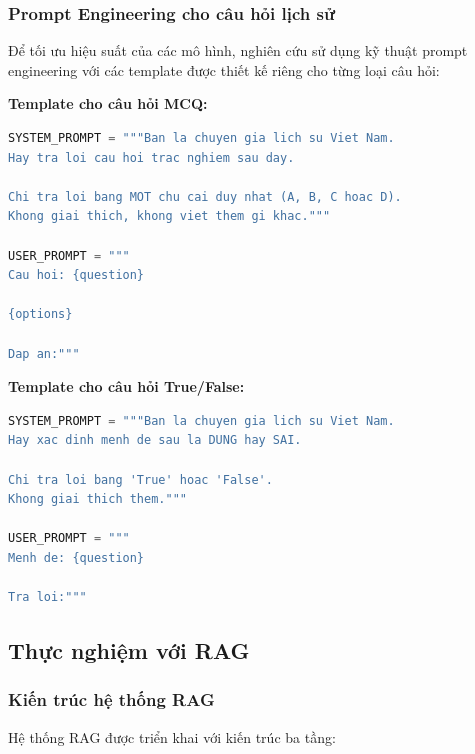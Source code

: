 \subsubsection{Prompt Engineering cho câu hỏi lịch sử}

Để tối ưu hiệu suất của các mô hình, nghiên cứu sử dụng kỹ thuật prompt engineering với các template được thiết kế riêng cho từng loại câu hỏi:

\textbf{Template cho câu hỏi MCQ:}
\begin{lstlisting}[language=Python, caption={Prompt template cho câu hỏi trắc nghiệm}]
SYSTEM_PROMPT = """Ban la chuyen gia lich su Viet Nam. 
Hay tra loi cau hoi trac nghiem sau day.

Chi tra loi bang MOT chu cai duy nhat (A, B, C hoac D).
Khong giai thich, khong viet them gi khac."""

USER_PROMPT = """
Cau hoi: {question}

{options}

Dap an:"""
\end{lstlisting}

\textbf{Template cho câu hỏi True/False:}
\begin{lstlisting}[language=Python, caption={Prompt template cho câu hỏi đúng/sai}]
SYSTEM_PROMPT = """Ban la chuyen gia lich su Viet Nam.
Hay xac dinh menh de sau la DUNG hay SAI.

Chi tra loi bang 'True' hoac 'False'.
Khong giai thich them."""

USER_PROMPT = """
Menh de: {question}

Tra loi:"""
\end{lstlisting}

\subsection{Thực nghiệm với RAG}

\subsubsection{Kiến trúc hệ thống RAG}

Hệ thống RAG được triển khai với kiến trúc ba tầng:


